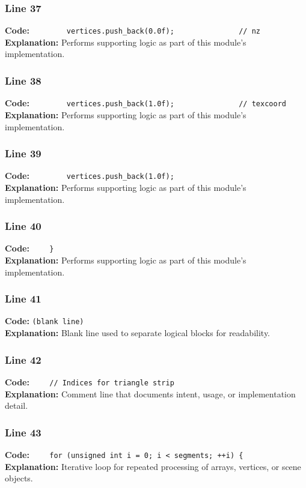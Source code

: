 \documentclass[11pt,a4paper]{article}
\begin{document}
\subsubsection*{Line 37}
\textbf{Code:} \verb|        vertices.push_back(0.0f);               // nz|\\
\textbf{Explanation:} Performs supporting logic as part of this module's implementation.

\subsubsection*{Line 38}
\textbf{Code:} \verb|        vertices.push_back(1.0f);               // texcoord|\\
\textbf{Explanation:} Performs supporting logic as part of this module's implementation.

\subsubsection*{Line 39}
\textbf{Code:} \verb|        vertices.push_back(1.0f);|\\
\textbf{Explanation:} Performs supporting logic as part of this module's implementation.

\subsubsection*{Line 40}
\textbf{Code:} \verb|    }|\\
\textbf{Explanation:} Performs supporting logic as part of this module's implementation.

\subsubsection*{Line 41}
\textbf{Code:} \texttt{(blank line)}\\
\textbf{Explanation:} Blank line used to separate logical blocks for readability.

\subsubsection*{Line 42}
\textbf{Code:} \verb|    // Indices for triangle strip|\\
\textbf{Explanation:} Comment line that documents intent, usage, or implementation detail.

\subsubsection*{Line 43}
\textbf{Code:} \verb|    for (unsigned int i = 0; i < segments; ++i) {|\\
\textbf{Explanation:} Iterative loop for repeated processing of arrays, vertices, or scene objects.
\end{document}
